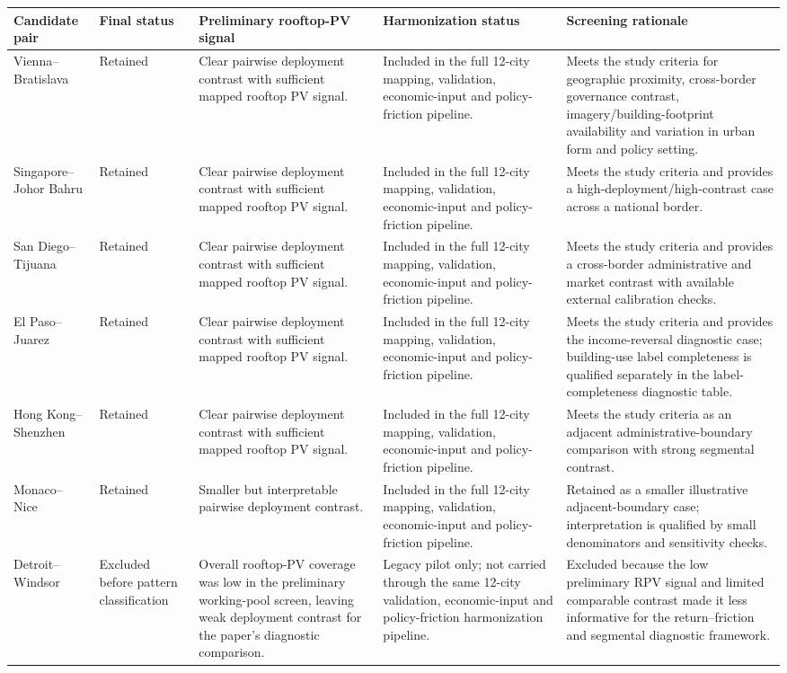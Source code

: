 \begin{tabular}{@{}p{2.6cm}p{1.8cm}p{3.0cm}p{3.1cm}p{4.1cm}@{}}
\toprule
Candidate pair & Final status & Preliminary rooftop-PV signal & Harmonization status & Screening rationale \\
\midrule
Vienna--Bratislava & Retained & Clear pairwise deployment contrast with sufficient mapped rooftop PV signal. & Included in the full 12-city mapping, validation, economic-input and policy-friction pipeline. & Meets the study criteria for geographic proximity, cross-border governance contrast, imagery/building-footprint availability and variation in urban form and policy setting. \\
Singapore--Johor Bahru & Retained & Clear pairwise deployment contrast with sufficient mapped rooftop PV signal. & Included in the full 12-city mapping, validation, economic-input and policy-friction pipeline. & Meets the study criteria and provides a high-deployment/high-contrast case across a national border. \\
San Diego--Tijuana & Retained & Clear pairwise deployment contrast with sufficient mapped rooftop PV signal. & Included in the full 12-city mapping, validation, economic-input and policy-friction pipeline. & Meets the study criteria and provides a cross-border administrative and market contrast with available external calibration checks. \\
El Paso--Juarez & Retained & Clear pairwise deployment contrast with sufficient mapped rooftop PV signal. & Included in the full 12-city mapping, validation, economic-input and policy-friction pipeline. & Meets the study criteria and provides the income-reversal diagnostic case; building-use label completeness is qualified separately in the label-completeness diagnostic table. \\
Hong Kong--Shenzhen & Retained & Clear pairwise deployment contrast with sufficient mapped rooftop PV signal. & Included in the full 12-city mapping, validation, economic-input and policy-friction pipeline. & Meets the study criteria as an adjacent administrative-boundary comparison with strong segmental contrast. \\
Monaco--Nice & Retained & Smaller but interpretable pairwise deployment contrast. & Included in the full 12-city mapping, validation, economic-input and policy-friction pipeline. & Retained as a smaller illustrative adjacent-boundary case; interpretation is qualified by small denominators and sensitivity checks. \\
Detroit--Windsor & Excluded before pattern classification & Overall rooftop-PV coverage was low in the preliminary working-pool screen, leaving weak deployment contrast for the paper's diagnostic comparison. & Legacy pilot only; not carried through the same 12-city validation, economic-input and policy-friction harmonization pipeline. & Excluded because the low preliminary RPV signal and limited comparable contrast made it less informative for the return--friction and segmental diagnostic framework. \\

\end{tabular}

